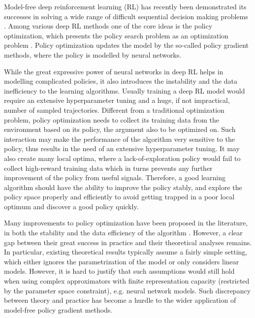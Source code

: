 Model-free deep reinforcement learning (RL) has recently been demonstrated its successes in solving a wide range of difficult sequential decision making problems \citep{schulman2015trust,mnih2015human,silver2016mastering}.
Among various deep RL methods one of the core ideas is the policy optimization, which presents the policy search problem as an optimization problem \citep{williams1991function,williams1992simple,sutton1998reinforcement}.
Policy optimization updates the model by the so-called policy gradient methods, where the policy is modelled by neural networks. 

While the great expressive power of neural networks in deep RL helps in modelling complicated policies, it also introduces the instability and the data inefficiency to the learning algorithms. 
Usually training a deep RL model would require an extensive hyperparameter tuning and a huge, if not impractical, number of sampled trajectories. 
Different from a traditional optimization problem, policy optimization needs to collect its training data from the environment based on its policy, the argument also to be optimized on.
Such interaction may make the performance of the algorithm very sensitive to the policy, thus results in the need of an extensive hyperparameter tuning.
It may also create many local optima, where a lack-of-exploration policy would fail to collect high-reward training data which in turns prevents any further improvement of the policy from useful signals.
Therefore,  a good learning algorithm should have the ability to improve the policy stably, and explore the policy space properly and efficiently to avoid getting trapped in a poor local optimum and discover a good policy quickly.


Many improvements to policy optimization have been proposed in the literature, in both the stability and the data efficiency of the algorithm \citep{peters2010relative,van2015learning,fox2015taming,schulman2015trust,montgomery2016guided,nachum2017bridging,nachum2017trust,tangkaratt2017guide,abdolmaleki2018maximum,haarnoja2018soft}. 
However, a clear gap between their great success in practice and their theoretical analyses remains.
In particular, existing theoretical results typically assume a fairly simple setting, which either ignores the parametrization of the model or only considers linear models. However, it is hard to justify that such assumptions would still hold when using complex approximators with finite representation capacity (restricted by the parameter space constraint), e.g. neural network models.
Such discrepancy between theory and practice has become a hurdle to the wider application of model-free policy gradient methods. 

